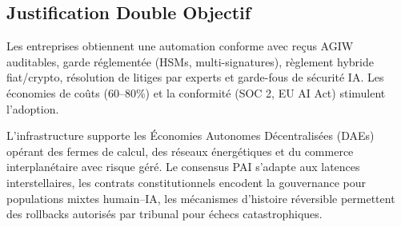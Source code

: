 \documentclass[11pt]{article}
\begin{document}
\subsection{Justification Double Objectif}
\begin{description}[style=nextline]
  \item[Court Terme (Ère MERCURE)] Les entreprises obtiennent une automation conforme avec reçus AGIW auditables, garde réglementée (HSMs, multi-signatures), règlement hybride fiat/crypto, résolution de litiges par experts et garde-fous de sécurité IA. Les économies de coûts (60--80\%) et la conformité (SOC 2, EU AI Act) stimulent l'adoption.
  \item[Échelle de Siècle (VÉNUS à ANDROMÈDE)] L'infrastructure supporte les Économies Autonomes Décentralisées (DAEs) opérant des fermes de calcul, des réseaux énergétiques et du commerce interplanétaire avec risque géré. Le consensus PAI s'adapte aux latences interstellaires, les contrats constitutionnels encodent la gouvernance pour populations mixtes humain--IA, les mécanismes d'histoire réversible permettent des rollbacks autorisés par tribunal pour échecs catastrophiques.
\end{description}
\end{document}
